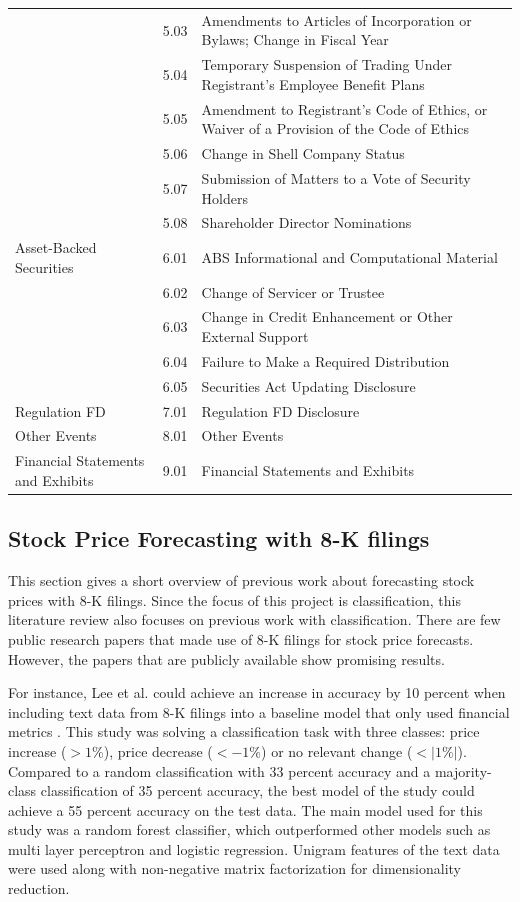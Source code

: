 \documentclass{article}
\begin{document}
\begin{table}[h!]
\begin{tabularx}{\textwidth}{|X|l|X|}
		& 5.03 & Amendments to Articles of Incorporation or Bylaws; Change in Fiscal Year \\
		& 5.04 & Temporary Suspension of Trading Under Registrant's Employee Benefit Plans \\
		& 5.05 & Amendment to Registrant's Code of Ethics, or Waiver of a Provision of the Code of Ethics \\
		& 5.06 & Change in Shell Company Status \\
		& 5.07 & Submission of Matters to a Vote of Security Holders \\
		& 5.08 & Shareholder Director Nominations \\
		Asset-Backed Securities & 6.01 & ABS Informational and Computational Material \\
		& 6.02 & Change of Servicer or Trustee \\
		& 6.03 & Change in Credit Enhancement or Other External Support \\
		& 6.04 & Failure to Make a Required Distribution \\
		& 6.05 & Securities Act Updating Disclosure \\
		Regulation FD & 7.01 & Regulation FD Disclosure \\
		Other Events & 8.01 & Other Events \\
		Financial Statements and Exhibits & 9.01 & Financial Statements and Exhibits \\
		\bottomrule
	\end{tabularx}

	\end{table}%

	\subsection{Stock Price Forecasting with 8-K filings}
	
	This section gives a short overview of previous work about forecasting stock prices with 8-K filings. Since the focus of this project is classification, this literature review also focuses on previous work with classification. There are few public research papers that made use of 8-K filings for stock price forecasts. However, the papers that are publicly available show promising results. 
	
	For instance, Lee et al. could achieve an increase in accuracy by 10 percent when including text data from 8-K filings into a baseline model that only used financial metrics \cite{lee_importance_2014}. This study was solving a classification task with three classes: price increase ($> 1\%$), price decrease ($< -1\%$) or no relevant change ($< |1 \%|$). Compared to a random classification with 33 percent accuracy and a majority-class classification of 35 percent accuracy, the best model of the study could achieve a 55 percent accuracy on the test data. The main model used for this study was a random forest classifier, which outperformed other models such as multi layer perceptron and logistic regression. Unigram features of the text data were used along with non-negative matrix factorization for dimensionality reduction.
	
\end{document}
